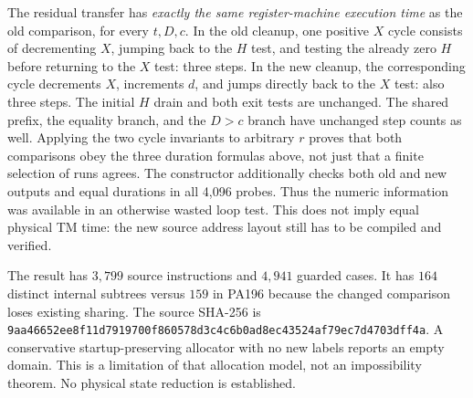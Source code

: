 The residual transfer has \emph{exactly the same register-machine execution
time} as the old comparison, for every $t,D,c$. In the old cleanup, one
positive $X$ cycle consists of decrementing $X$, jumping back to the
$H$ test, and testing the already zero $H$ before returning to the $X$
test: three steps. In the new cleanup, the corresponding cycle decrements
$X$, increments $d$, and jumps directly back to the $X$ test: also three
steps. The initial $H$ drain and both exit tests are unchanged. The shared
prefix, the equality branch, and the $D>c$ branch have unchanged step
counts as well. Applying the two cycle invariants to arbitrary $r$ proves
that both comparisons obey the three duration formulas above, not just
that a finite selection of runs agrees. The constructor additionally
checks both old and new outputs and equal durations in all 4,096 probes.
Thus the numeric information was available in an otherwise wasted loop
test. This does not imply equal physical TM time: the new source address
layout still has to be compiled and verified.

The result has $3,799$ source instructions and $4,941$ guarded cases.
It has $164$ distinct internal subtrees versus $159$ in PA196 because
the changed comparison loses existing sharing. The source SHA-256 is
\texttt{9aa46652ee8f11d7919700f860578d3c4c6b0ad8ec43524af79ec7d4703dff4a}.
A conservative startup-preserving allocator with no new labels reports
an empty domain. This is a limitation of that allocation model, not an
impossibility theorem. No physical state reduction is established.
